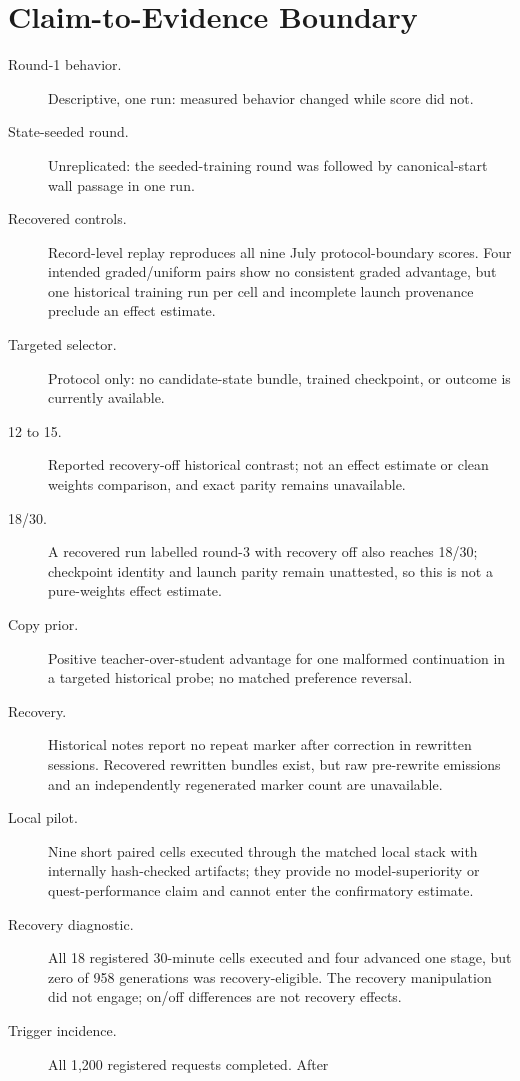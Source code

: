 \documentclass[11pt,a4paper]{article}
\begin{document}
\section{Claim-to-Evidence Boundary}

\begin{description}
\item[Round-1 behavior.] Descriptive, one run: measured behavior changed while score did not.
\item[State-seeded round.] Unreplicated: the seeded-training round was followed by canonical-start wall passage in one run.
\item[Recovered controls.] Record-level replay reproduces all nine July
protocol-boundary scores. Four intended graded/uniform pairs show no consistent
graded advantage, but one historical training run per cell and incomplete
launch provenance preclude an effect estimate.
\item[Targeted selector.] Protocol only: no candidate-state bundle, trained checkpoint, or outcome is currently available.
\item[12 to 15.] Reported recovery-off historical contrast; not an effect estimate or clean weights comparison, and exact parity remains unavailable.
\item[18/30.] A recovered run labelled round-3 with recovery off also reaches
18/30; checkpoint identity and launch parity remain unattested, so this is not
a pure-weights effect estimate.
\item[Copy prior.] Positive teacher-over-student advantage for one malformed
continuation in a targeted historical probe; no matched preference reversal.
\item[Recovery.] Historical notes report no repeat marker after correction in
rewritten sessions. Recovered rewritten bundles exist, but raw pre-rewrite
emissions and an independently regenerated marker count are unavailable.
\item[Local pilot.] Nine short paired cells executed through the matched local
stack with internally hash-checked artifacts; they provide no model-superiority or quest-performance
claim and cannot enter the confirmatory estimate.
\item[Recovery diagnostic.] All 18 registered 30-minute cells executed and four
advanced one stage, but zero of 958 generations was recovery-eligible. The
recovery manipulation did not engage; on/off differences are not recovery
effects.
\item[Trigger incidence.] All 1,200 registered requests completed. After

\end{description}
\end{document}
